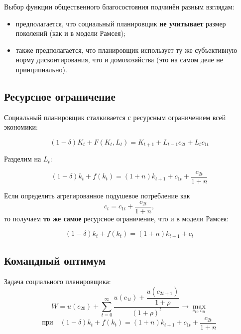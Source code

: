 \documentclass[10pt,a4paper]{article}
\begin{document}
Выбор функции общественного благосостояния подчинён разным взглядам:
\begin{itemize}[leftmargin=1.3em]
\item предполагается, что социальный планировщик \textbf{не учитывает} размер поколений (как и в модели Рамсея);
\item также предполагается, что планировщик использует ту же субъективную норму дисконтирования, что и домохозяйства (это на самом деле не принципиально).
\end{itemize}

\subsection{Ресурсное ограничение}

Социальный планировщик сталкивается с ресурсным ограничением всей экономики:
\begin{formulabox}
\begin{equation}
(1-\delta)K_t + F(K_t, L_t) = K_{t+1} + L_{t-1}c_{2t} + L_t c_{1t} \tag{4.14}
\end{equation}
\end{formulabox}

Разделим на $L_t$:
\begin{formulabox}
\begin{equation}
(1-\delta)k_t + f(k_t) = (1+n)k_{t+1} + c_{1t} + \frac{c_{2t}}{1+n} \tag{4.15}
\end{equation}
\end{formulabox}

Если определить агрегированное подушевое потребление как
$$c_t = c_{1t} + \frac{c_{2t}}{1+n},$$
то получаем \textbf{то же самое} ресурсное ограничение, что и в модели Рамсея:
\begin{formulabox}
\begin{equation}
(1-\delta)k_t + f(k_t) = (1+n)k_{t+1} + c_t \tag{4.15}
\end{equation}
\end{formulabox}

\subsection{Командный оптимум}

Задача социального планировщика:
$$W = u(c_{20}) + \sum_{t=0}^{\infty} \frac{u(c_{1t}) + \dfrac{u(c_{2t+1})}{1+\rho}}{(1+\rho)^t} \to \max_{c_{1t}, c_{2t}}$$
$$\text{при} \quad (1-\delta)k_t + f(k_t) = (1+n)k_{t+1} + c_{1t} + \frac{c_{2t}}{1+n}$$
\end{document}
